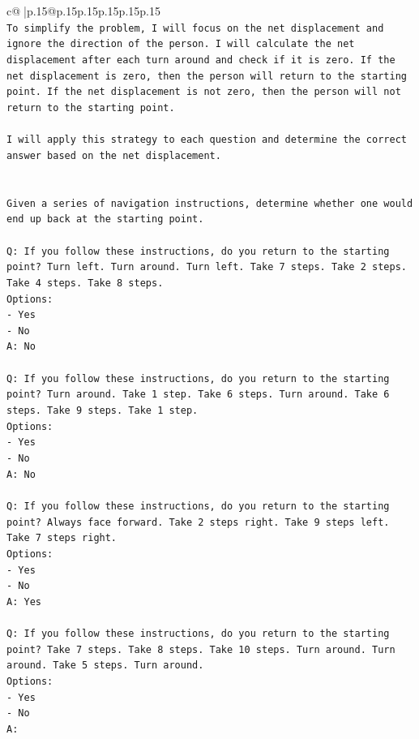 \documentclass{article}
\begin{document}
{\begin{supertabular}{c@{$\;$}|p{.15\linewidth}@{}p{.15\linewidth}p{.15\linewidth}p{.15\linewidth}p{.15\linewidth}p{.15\linewidth}}
{{{\\ 
\texttt{To simplify the problem, I will focus on the net displacement and ignore the direction of the person. I will calculate the net displacement after each turn around and check if it is zero. If the net displacement is zero, then the person will return to the starting point. If the net displacement is not zero, then the person will not return to the starting point. } \\
\\ 
\texttt{I will apply this strategy to each question and determine the correct answer based on the net displacement.} \\
\\ 
\\ 
\texttt{Given a series of navigation instructions, determine whether one would end up back at the starting point.} \\
\\ 
\texttt{Q: If you follow these instructions, do you return to the starting point? Turn left. Turn around. Turn left. Take 7 steps. Take 2 steps. Take 4 steps. Take 8 steps.} \\
\texttt{Options:} \\
\texttt{{-} Yes} \\
\texttt{{-} No} \\
\texttt{A: No} \\
\\ 
\texttt{Q: If you follow these instructions, do you return to the starting point? Turn around. Take 1 step. Take 6 steps. Turn around. Take 6 steps. Take 9 steps. Take 1 step.} \\
\texttt{Options:} \\
\texttt{{-} Yes} \\
\texttt{{-} No} \\
\texttt{A: No} \\
\\ 
\texttt{Q: If you follow these instructions, do you return to the starting point? Always face forward. Take 2 steps right. Take 9 steps left. Take 7 steps right.} \\
\texttt{Options:} \\
\texttt{{-} Yes} \\
\texttt{{-} No} \\
\texttt{A: Yes} \\
\\ 
\texttt{Q: If you follow these instructions, do you return to the starting point? Take 7 steps. Take 8 steps. Take 10 steps. Turn around. Turn around. Take 5 steps. Turn around.} \\
\texttt{Options:} \\
\texttt{{-} Yes} \\
\texttt{{-} No} \\
\texttt{A:} \\
            }
        }
    }
     \\ \\


\end{supertabular}}
\end{document}
